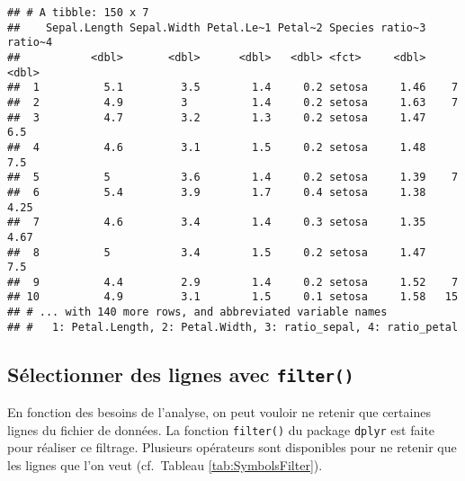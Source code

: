 \documentclass[
  french,
]{book}
\begin{document}
\begin{verbatim}
## # A tibble: 150 x 7
##    Sepal.Length Sepal.Width Petal.Le~1 Petal~2 Species ratio~3 ratio~4
##           <dbl>       <dbl>      <dbl>   <dbl> <fct>     <dbl>   <dbl>
##  1          5.1         3.5        1.4     0.2 setosa     1.46    7   
##  2          4.9         3          1.4     0.2 setosa     1.63    7   
##  3          4.7         3.2        1.3     0.2 setosa     1.47    6.5 
##  4          4.6         3.1        1.5     0.2 setosa     1.48    7.5 
##  5          5           3.6        1.4     0.2 setosa     1.39    7   
##  6          5.4         3.9        1.7     0.4 setosa     1.38    4.25
##  7          4.6         3.4        1.4     0.3 setosa     1.35    4.67
##  8          5           3.4        1.5     0.2 setosa     1.47    7.5 
##  9          4.4         2.9        1.4     0.2 setosa     1.52    7   
## 10          4.9         3.1        1.5     0.1 setosa     1.58   15   
## # ... with 140 more rows, and abbreviated variable names
## #   1: Petal.Length, 2: Petal.Width, 3: ratio_sepal, 4: ratio_petal
\end{verbatim}

\hypertarget{suxe9lectionner-des-lignes-avec-filter}{%
\subsection{\texorpdfstring{Sélectionner des lignes avec \texttt{filter()}}{Sélectionner des lignes avec filter()}}\label{suxe9lectionner-des-lignes-avec-filter}}

En fonction des besoins de l'analyse, on peut vouloir ne retenir que certaines lignes du fichier de données. La fonction \texttt{filter()} du package \texttt{dplyr} est faite pour réaliser ce filtrage. Plusieurs opérateurs sont disponibles pour ne retenir que les lignes que l'on veut (cf.~Tableau \ref{tab:SymbolsFilter}).

\providecommand{\docline}[3]{\noalign{\global\setlength{\arrayrulewidth}{#1}}\arrayrulecolor[HTML]{#2}\cline{#3}}

\setlength{\tabcolsep}{0pt}

\renewcommand*{\arraystretch}{1.5}
\end{document}
